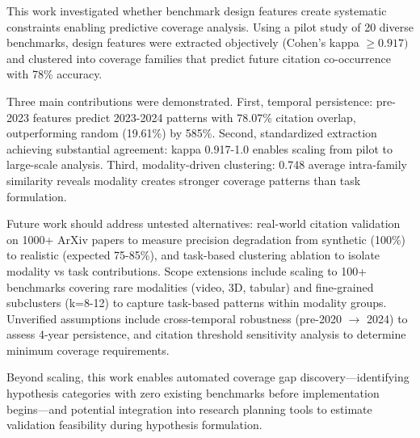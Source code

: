 
This work investigated whether benchmark design features create systematic constraints enabling predictive coverage analysis. Using a pilot study of 20 diverse benchmarks, design features were extracted objectively (Cohen's kappa $\geq 0.917)$ and clustered into coverage families that predict future citation co-occurrence with 78\% accuracy.

Three main contributions were demonstrated. First, temporal persistence: pre-2023 features predict 2023-2024 patterns with 78.07\% citation overlap, outperforming random (19.61\%) by 585\%. Second, standardized extraction achieving substantial agreement: kappa 0.917-1.0 enables scaling from pilot to large-scale analysis. Third, modality-driven clustering: 0.748 average intra-family similarity reveals modality creates stronger coverage patterns than task formulation.

Future work should address untested alternatives: real-world citation validation on 1000+ ArXiv papers to measure precision degradation from synthetic (100\%) to realistic (expected 75-85\%), and task-based clustering ablation to isolate modality vs task contributions. Scope extensions include scaling to 100+ benchmarks covering rare modalities (video, 3D, tabular) and fine-grained subclusters (k=8-12) to capture task-based patterns within modality groups. Unverified assumptions include cross-temporal robustness (pre-2020 $\rightarrow$ 2024) to assess 4-year persistence, and citation threshold sensitivity analysis to determine minimum coverage requirements.

Beyond scaling, this work enables automated coverage gap discovery---identifying hypothesis categories with zero existing benchmarks before implementation begins---and potential integration into research planning tools to estimate validation feasibility during hypothesis formulation.
